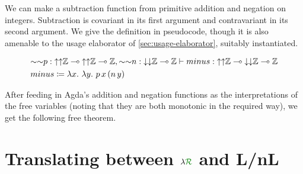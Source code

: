 \begin{example}\label{thm:minus}
  We can make a subtraction function from primitive addition and negation on
  integers.
  Subtraction is covariant in its first argument and contravariant in its
  second argument.
  We give the definition in pseudocode, though it is also amenable to the
  usage elaborator of \cref{sec:usage-elaborator}, suitably instantiated.

  \begin{align*}
    &{\sim\sim}p :
      {\uparrow\uparrow}\mathbb Z \multimap
      {\uparrow\uparrow}\mathbb Z \multimap \mathbb Z,
      {\sim\sim}n : {\downarrow\downarrow}\mathbb Z \multimap \mathbb Z
      \vdash \mathnormal{minus} :
      {\uparrow\uparrow}\mathbb Z \multimap
      {\downarrow\downarrow}\mathbb Z \multimap
      \mathbb Z
    \\
    &\mathnormal{minus} \coloneqq \lambda x.~\lambda y.~p\,x\,(n\,y)
  \end{align*}

  After feeding in Agda's addition and negation functions as the
  interpretations of the free variables (noting that they are both monotonic
  in the required way), we get the following free theorem.





\end{example}

\section{Translating between $\name$ and L/nL}\label{sec:lnl}

